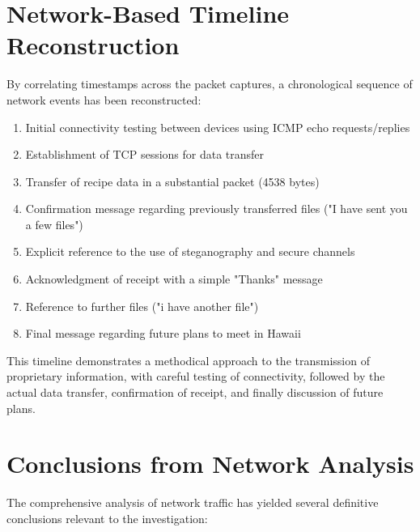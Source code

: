 \section{Network-Based Timeline Reconstruction}

By correlating timestamps across the packet captures, a chronological sequence of network events has been reconstructed:

\begin{enumerate}
    \item Initial connectivity testing between devices using ICMP echo requests/replies
    \item Establishment of TCP sessions for data transfer
    \item Transfer of recipe data in a substantial packet (4538 bytes)
    \item Confirmation message regarding previously transferred files ("I have sent you a few files")
    \item Explicit reference to the use of steganography and secure channels
    \item Acknowledgment of receipt with a simple "Thanks" message
    \item Reference to further files ("i have another file")
    \item Final message regarding future plans to meet in Hawaii
\end{enumerate}

This timeline demonstrates a methodical approach to the transmission of proprietary information, with careful testing of connectivity, followed by the actual data transfer, confirmation of receipt, and finally discussion of future plans.

\section{Conclusions from Network Analysis}

The comprehensive analysis of network traffic has yielded several definitive conclusions relevant to the investigation:

